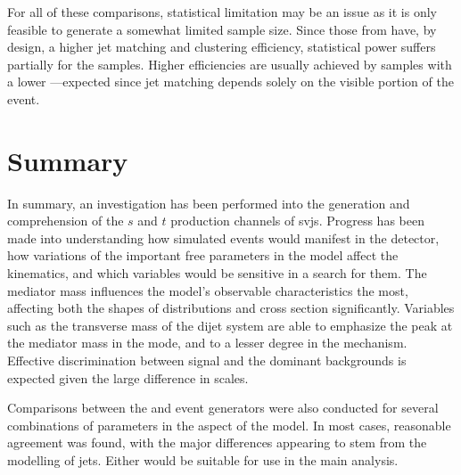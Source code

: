 For all of these comparisons, statistical limitation may be an issue as it is only feasible to generate a somewhat limited sample size. Since those from \PYTHIA have, by design, a higher \gls{jet} matching and clustering efficiency, statistical power suffers partially for the \MADGRAPH samples. Higher efficiencies are usually achieved by samples with a lower \rinv---expected since \gls{jet} matching depends solely on the visible portion of the event.




\section{Summary}
\label{sec:svj_summary}

In summary, an investigation has been performed into the generation and comprehension of the $s$ and $t$ production channels of \glspl{svj}. Progress has been made into understanding how simulated events would manifest in the detector, how variations of the important free parameters in the model affect the kinematics, and which variables would be sensitive in a search for them. The mediator mass influences the model's observable characteristics the most, affecting both the shapes of distributions and cross section significantly. Variables such as the transverse mass of the dijet system are able to emphasize the peak at the mediator mass in the \schannel mode, and to a lesser degree in the \tchannel mechanism. Effective discrimination between signal and the dominant backgrounds is expected given the large difference in \mT scales.

Comparisons between the \MGvATNLO and \PYTHIAEIGHT event generators were also conducted for several combinations of parameters in the \schannel aspect of the model. In most cases, reasonable agreement was found, with the major differences appearing to stem from the modelling of \glspl{jet}. Either would be suitable for use in the main analysis.


